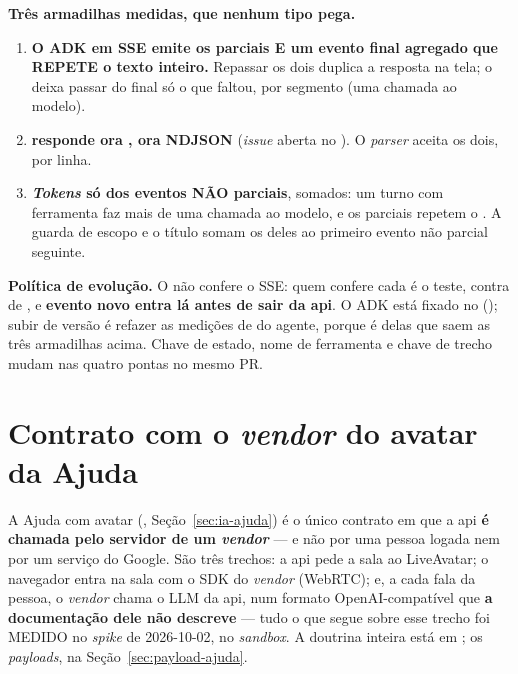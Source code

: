 \begin{atencao}
\textbf{Três armadilhas medidas, que nenhum tipo pega.}
\begin{enumerate}
  \item \textbf{O ADK em SSE emite os parciais E um evento final agregado que
    REPETE o texto inteiro.} Repassar os dois duplica a resposta na tela; o
     deixa passar do final só o que faltou, por segmento
    (uma chamada ao modelo).
  \item \textbf{ responde ora , ora NDJSON}
    (\emph{issue} aberta no ). O \emph{parser} aceita os dois,
    por linha.
  \item \textbf{\emph{Tokens} só dos eventos NÃO parciais}, somados: um turno com
    ferramenta faz mais de uma chamada ao modelo, e os parciais repetem o
    . A guarda de escopo e o título somam os deles ao
    primeiro evento não parcial seguinte.
\end{enumerate}
\end{atencao}

\textbf{Política de evolução.} O  não confere o SSE: quem
confere cada  é o teste, contra  de
, e \textbf{evento novo entra lá antes de sair da api}.
O ADK está fixado no  (); subir de versão
é refazer as medições de  do agente, porque é delas que
saem as três armadilhas acima. Chave de estado, nome de ferramenta e chave de
trecho mudam nas quatro pontas no mesmo PR.

\section{Contrato com o \emph{vendor} do avatar da Ajuda}
\label{sec:contrato-ajuda}

A Ajuda com avatar (, Seção~\ref{sec:ia-ajuda}) é o único contrato
em que a api \textbf{é chamada pelo servidor de um \emph{vendor}} --- e não por
uma pessoa logada nem por um serviço do Google. São três trechos: a api pede a
sala ao LiveAvatar; o navegador entra na sala com o SDK do \emph{vendor}
(WebRTC); e, a cada fala da pessoa, o \emph{vendor} chama o LLM da api, num
formato OpenAI-compatível que \textbf{a documentação dele não descreve} --- tudo
o que segue sobre esse trecho foi MEDIDO no \emph{spike} de 2026-10-02, no
\emph{sandbox}. A doutrina inteira está em ; os
\emph{payloads}, na Seção~\ref{sec:payload-ajuda}.

